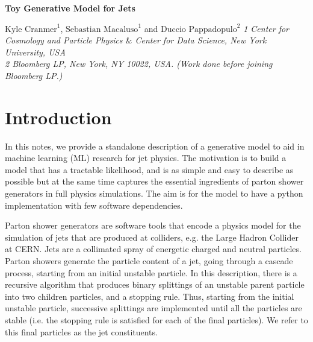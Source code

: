 \documentclass[12pt]{article}
\begin{document}
%


\begin{center}

\vskip 1cm
{\Large \bf Toy Generative Model for Jets}

\vskip 1.0cm
{\large $\text{Kyle Cranmer}^1$, $\text{Sebastian Macaluso}^1$ and $\text{Duccio Pappadopulo}^2$}
\vskip 0.6cm
{\small \it 1 Center for Cosmology and Particle Physics $\&$ Center for Data Science, New York University, USA} \\
{\small \it 2 Bloomberg LP, New York, NY 10022, USA. (Work done before joining Bloomberg LP.)}
\vskip 2.0cm

\end{center}




\section{Introduction}

In this notes, we provide a standalone description of a generative model to aid in machine learning (ML) research for jet physics. The motivation is to build a model that has a tractable likelihood, and is as simple and easy to describe as possible but at the same time captures the essential ingredients of parton shower generators in full physics simulations.  The aim is for the model to have a python implementation with few software dependencies.

Parton shower generators are software tools that encode a physics model for the simulation of jets that are produced at colliders, e.g. the Large Hadron Collider at CERN.
Jets are a collimated spray of energetic charged and neutral particles. Parton showers generate the particle content of a jet, going through a cascade process, starting from an initial unstable particle. In this description, there is a recursive algorithm that produces binary splittings of an unstable parent particle into two children particles, and a stopping rule. Thus, starting from the initial unstable particle, successive splittings are implemented until all the particles are stable (i.e. the stopping rule is satisfied for each of the final particles). We refer to this final particles as the jet constituents.
\end{document}
